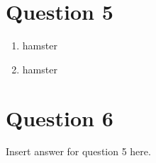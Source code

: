 \documentclass{article}
\begin{document}
    \section*{Question 5}
        \begin{enumerate}[label=\arabic*.]
            \item hamster
            \item hamster
        \end{enumerate}
    \newpage
    \section*{Question 6}
    Insert answer for question 5 here.

   

   
\end{document}

